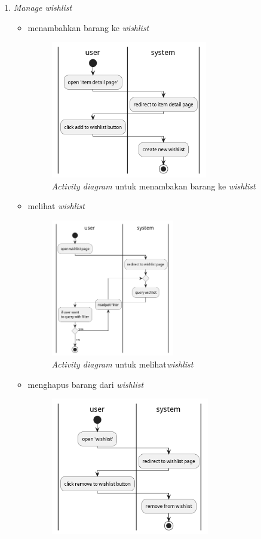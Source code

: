 \documentclass[a4paper]{article}
\begin{document}
\begin{enumerate}
\begin{enumerate}
        \item \textit{Manage wishlist}
        \begin{itemize}
            \item menambahkan barang ke \textit{wishlist}
            \begin{figure}[h]
                \centering
                \includegraphics*[height=6cm]{./diagram/activity diagram/12. wishlist/add to wishlist/add to wishlist.png}
                \caption{\textit{Activity diagram} untuk menambakan barang ke \textit{wishlist}}
            \end{figure}
            \newpage
            \item melihat \textit{wishlist}
            \begin{figure}[h]
                \centering
                \includegraphics*[height=6cm]{./diagram/activity diagram/12. wishlist/query wishlist/query wishlist.png}
                \caption{\textit{Activity diagram} untuk melihat\textit{wishlist}}
            \end{figure}
            \item menghapus barang dari \textit{wishlist}
            \begin{figure}[h]
                \centering
                \includegraphics*[height=6cm]{./diagram/activity diagram/12. wishlist/remove from wishlist/add to wishlist.png}

\end{figure}
\end{itemize}
\end{enumerate}
\end{enumerate}
\end{document}
